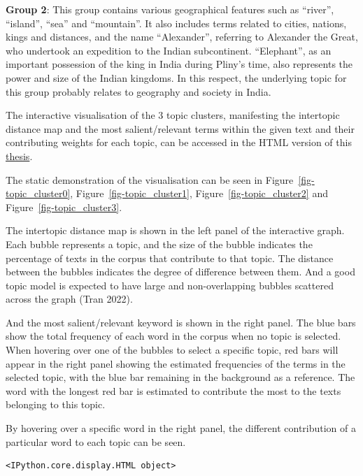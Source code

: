 \documentclass[
  12pt,
]{article}
\begin{document}
\textbf{Group 2}: This group contains various geographical features such
as ``river'', ``island'', ``sea'' and ``mountain''. It also includes
terms related to cities, nations, kings and distances, and the name
``Alexander'', referring to Alexander the Great, who undertook an
expedition to the Indian subcontinent. ``Elephant'', as an important
possession of the king in India during Pliny's time, also represents the
power and size of the Indian kingdoms. In this respect, the underlying
topic for this group probably relates to geography and society in India.

The interactive visualisation of the 3 topic clusters, manifesting the
intertopic distance map and the most salient/relevant terms within the
given text and their contributing weights for each topic, can be
accessed in the HTML version of this
\href{https://raw.githack.com/lizaodawn/NH_thesis/main/NHthesis_structure.html}{thesis}.

The static demonstration of the visualisation can be seen in
Figure~\ref{fig-topic_cluster0}, Figure~\ref{fig-topic_cluster1},
Figure~\ref{fig-topic_cluster2} and Figure~\ref{fig-topic_cluster3}.

The intertopic distance map is shown in the left panel of the
interactive graph. Each bubble represents a topic, and the size of the
bubble indicates the percentage of texts in the corpus that contribute
to that topic. The distance between the bubbles indicates the degree of
difference between them. And a good topic model is expected to have
large and non-overlapping bubbles scattered across the graph (Tran
2022).

And the most salient/relevant keyword is shown in the right panel. The
blue bars show the total frequency of each word in the corpus when no
topic is selected. When hovering over one of the bubbles to select a
specific topic, red bars will appear in the right panel showing the
estimated frequencies of the terms in the selected topic, with the blue
bar remaining in the background as a reference. The word with the
longest red bar is estimated to contribute the most to the texts
belonging to this topic.

By hovering over a specific word in the right panel, the different
contribution of a particular word to each topic can be seen.

\begin{verbatim}
<IPython.core.display.HTML object>
\end{verbatim}
\end{document}
